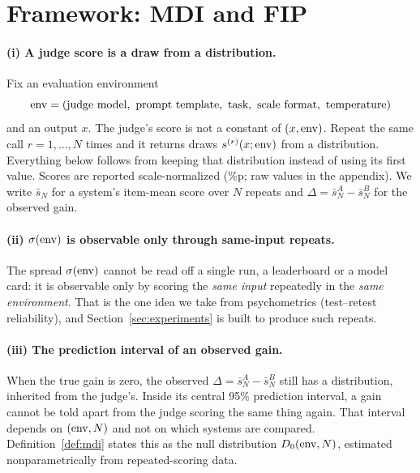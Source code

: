 \section{Framework: MDI and FIP}
\label{sec:framework}

\paragraph{(i) A judge score is a draw from a distribution.}
Fix an evaluation environment
\begin{equation*}
  \mathrm{env} = (\text{judge model},\ \text{prompt template},\ \text{task},\
  \text{scale format},\ \text{temperature})
\end{equation*}
and an output $x$. The judge's score is not a constant of $(x, \mathrm{env})$. Repeat
the same call $r = 1, \dots, N$ times and it returns draws $s^{(r)}(x;\mathrm{env})$
from a distribution. Everything below follows from keeping that distribution
instead of using its first value. Scores are reported scale-normalized (\%p;
raw values in the appendix). We write $\bar{s}_N$ for a system's item-mean
score over $N$ repeats and $\Delta = \bar{s}_N^A - \bar{s}_N^B$ for the
observed gain.

\paragraph{(ii) $\sigma(\mathrm{env})$ is observable only through same-input repeats.}
The spread $\sigma(\mathrm{env})$ cannot be read off a single run, a leaderboard or a
model card: it is observable only by scoring the \emph{same input} repeatedly
in the \emph{same environment}. That is the one idea we take from psychometrics
(test--retest reliability), and Section~\ref{sec:experiments} is built to
produce such repeats.

\paragraph{(iii) The prediction interval of an observed gain.}
When the true gain is zero, the observed $\Delta = \bar{s}_N^A - \bar{s}_N^B$
still has a distribution, inherited from the judge's. Inside its central 95\%
prediction interval, a gain cannot be told apart from the judge scoring the
same thing again. That interval depends on $(\mathrm{env}, N)$ and not on which
systems are compared. Definition~\ref{def:mdi} states this as the null
distribution $D_0(\mathrm{env}, N)$, estimated nonparametrically from
repeated-scoring data.

